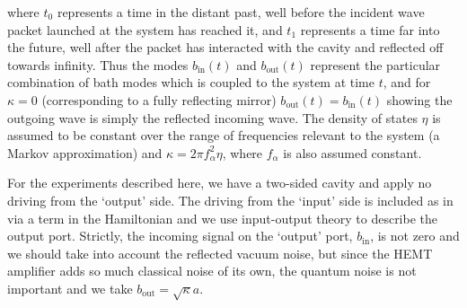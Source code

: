 where $t_0$ represents a time in the distant past, well before the incident wave packet launched at the system has reached it, and $t_1$ represents a time far into the future, well after the packet has interacted with the cavity and reflected off towards infinity. Thus the modes $b_\text{in}(t)$ and $b_\text{out}(t)$  represent the particular combination of bath modes which is coupled to the system at time $t$, and for $\kappa=0$ (corresponding to a fully reflecting mirror) $b_\text{out}(t)=b_\text{in}(t)$ showing the outgoing wave is simply the reflected incoming wave. The density of states $\eta$ is assumed to be constant over the range of frequencies relevant to the system (a Markov approximation) and $\kappa=2\pi f_\alpha^2\eta$, where $f_\alpha$ is also assumed constant.

For the experiments described here, we have a two-sided cavity and apply no driving from the `output' side. The driving from the `input' side is included as in  via a term in the Hamiltonian and we use input-output theory to describe the output port. Strictly, the incoming signal on the `output' port, $b_\text{in}$, is not zero and we should take into account the reflected vacuum noise, but since the HEMT amplifier adds so much classical noise of its own, the quantum noise is not important and we take $b_\text{out}=\sqrt{\kappa} a$.

